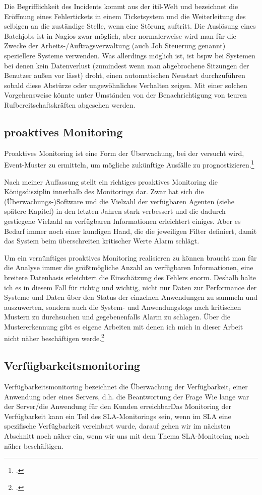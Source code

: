 \documentclass[12pt,a4paper,parskip,listof=totoc,bibliography=totoc]{scrreprt}
\begin{document}
	Die Begrifflichkeit des Incidents kommt aus der \acrshort{itil}-Welt und bezeichnet die Eröffnung eines Fehlertickets in einem Ticketsystem und die Weiterleitung des selbigen an die zuständige Stelle, wenn eine Störung auftritt. Die Auslösung eines Batchjobs ist in Nagios zwar möglich, aber normalerweise wird man für die Zwecke der Arbeits-/Auftragsverwaltung (auch Job Steuerung genannt) speziellere Systeme verwenden. Was allerdings möglich ist, ist \acrlong{bspw} bei Systemen bei denen kein Datenverlust (zumindest wenn man abgebrochene Sitzungen der Benutzer außen vor lässt) droht, einen automatischen Neustart durchzuführen sobald diese Abstürze oder ungewöhnliches Verhalten zeigen. Mit einer solchen Vorgehensweise könnte unter Umständen von der Benachrichtigung von teuren Rufbereitschaftskräften abgesehen werden.
	 
	\subsection{proaktives Monitoring}
	\glqq Proaktives Monitoring ist eine Form der Überwachung, bei der versucht wird, Event-Muster zu ermitteln, um mögliche zukünftige Ausfälle zu prognostizieren.\grqq \footcite[S. 511]{ebelitilv3}
	
	Nach meiner Auffassung stellt ein richtiges proaktives Monitoring die Königsdisziplin innerhalb des Monitorings dar. Zwar hat sich die (Überwachungs-)Software und die Vielzahl der verfügbaren Agenten (siehe spätere Kapitel) in den letzten Jahren stark verbessert und die dadurch gestiegene Vielzahl an verfügbaren Informationen erleichtert einiges. Aber es Bedarf immer noch einer kundigen Hand, die die jeweiligen Filter definiert, damit das System beim überschreiten kritischer Werte Alarm schlägt. 
	
	Um ein vernünftiges proaktives Monitoring realisieren zu können braucht man für die Analyse immer die größtmögliche Anzahl an verfügbaren Informationen, eine breitere Datenbasis erleichtert die Einschätzung des Fehlers enorm. Deshalb halte ich es in diesem Fall für richtig und wichtig, nicht nur Daten zur Performance der Systeme und Daten über den Status der einzelnen Anwendungen zu sammeln und auszuwerten, sondern auch die System- und Anwendungslogs nach kritischen Mustern zu durchsuchen und gegebenenfalls Alarm zu schlagen. Über die Mustererkennung gibt es eigene Arbeiten mit denen ich mich in dieser Arbeit nicht näher beschäftigen werde.\footcite{Borkmann2009}
	\subsection{Verfügbarkeitsmonitoring}
	Verfügbarkeitsmonitoring bezeichnet die Überwachung der Verfügbarkeit, einer Anwendung oder eines Servers, d.h. die Beantwortung der Frage \glqq Wie lange war der Server/die Anwendung für den Kunden erreichbar\grqq\. Das Monitoring der Verfügbarkeit kann ein Teil des SLA-Monitorings sein, wenn im SLA eine spezifische Verfügbarkeit vereinbart wurde, darauf gehen wir im nächsten Abschnitt noch näher ein, wenn wir uns mit dem Thema SLA-Monitoring noch näher beschäftigen.
\end{document}
